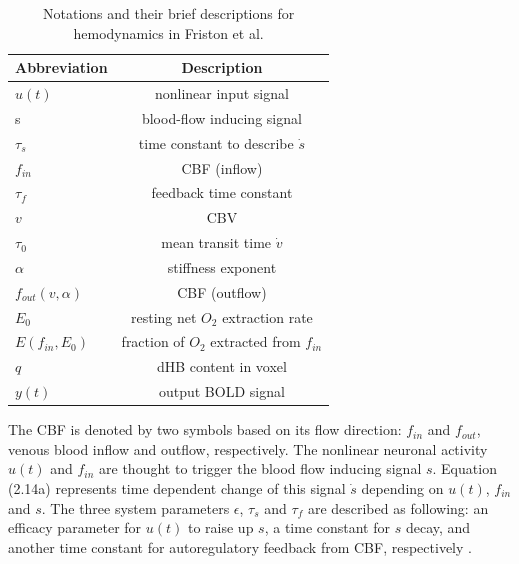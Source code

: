 \begin{table}[h]
\begin{center}
\caption[BOLD Abbreviations]{Notations and their brief descriptions for hemodynamics in Friston et al. }
\begin{tabular}{ l | c }
  Abbreviation & Description \\
  \hline  \hline                     
  $u(t)$ &      nonlinear input signal  
\\ \hline

  s & blood-flow inducing signal 
\\ \hline
  $\tau_s$ & time constant to describe $\dot{s}$  
\\ \hline  
  $f_{in}$ & CBF (inflow) 
 \\ \hline
 $\tau_f$  & feedback time constant 
\\ \hline  
 $v$    & CBV    
\\ \hline
 $\tau_0$  & mean transit time $\dot{v}$    
\\ \hline 
 $\alpha$  & stiffness exponent
\\ \hline 

  $f_{out}(v, \alpha)$ & CBF (outflow) 
\\ \hline
 $E_0$  & resting net $O_2$ extraction rate 
\\ \hline
 $E(f_{in}, E_0)$    & fraction of $O_2$ extracted from $f_{in}$    
\\ \hline
 $q$    &  dHB content in voxel 
\\ \hline
 $y(t)$    &  output BOLD signal          \\
\hline  
  \hline 
 
\end{tabular}
\label{table:BOLD Abbreviations}
\end{center}
\end{table}	


The CBF is denoted by two symbols based on its flow direction: $f_{in}$ and $f_{out}$, venous blood inflow and outflow, respectively. The nonlinear neuronal activity $u(t)$ and $f_{in}$ are thought to trigger the blood flow inducing signal $s$. Equation (2.14a) represents time dependent change of this signal $\dot{s}$ depending on $u(t)$, $f_{in}$ and $s$. The three system parameters $\epsilon$, $\tau_s$ and $\tau_f$ are described as following: an efficacy parameter for $u(t)$ to raise up $s$, a time constant for $s$ decay, and another time constant for autoregulatory feedback from CBF, respectively \citep{XYZ1994, XYZ1998}.

